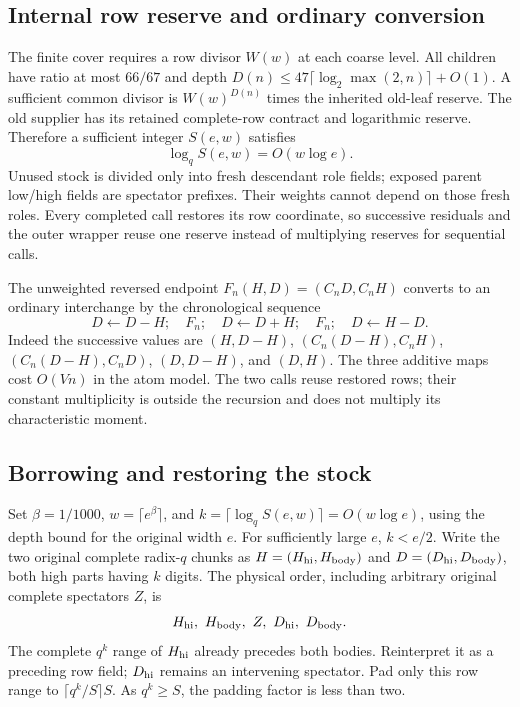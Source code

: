 \subsection{Internal row reserve and ordinary conversion}
The finite cover requires a row divisor $W(w)$ at each coarse level.
All children have ratio at most $66/67$ and depth
$D(n)\le47\lceil\log_2\max(2,n)\rceil+O(1)$.
A sufficient common divisor is $W(w)^{D(n)}$ times the inherited old-leaf
reserve. The old supplier has its retained complete-row contract and
logarithmic reserve. Therefore a sufficient integer $S(e,w)$ satisfies
\[
 \log_qS(e,w)=O(w\log e).
\]
Unused stock is divided only into fresh descendant role fields; exposed
parent low/high fields are spectator prefixes. Their weights cannot depend
on those fresh roles. Every completed call restores its row coordinate,
so successive residuals and the outer wrapper reuse one reserve instead
of multiplying reserves for sequential calls.

The unweighted reversed endpoint $F_n(H,D)=(C_nD,C_nH)$ converts to an
ordinary interchange by the chronological sequence
\[
 D\leftarrow D-H;\quad F_n;\quad D\leftarrow D+H;\quad
 F_n;\quad D\leftarrow H-D.
\]
Indeed the successive values are $(H,D-H)$, $(C_n(D-H),C_nH)$,
$(C_n(D-H),C_nD)$, $(D,D-H)$, and $(D,H)$.
The three additive maps cost $O(Vn)$ in the atom model. The two calls
reuse restored rows; their constant multiplicity is outside the recursion
and does not multiply its characteristic moment.

\subsection{Borrowing and restoring the stock}
Set $\beta=1/1000$, $w=\lceil e^\beta\rceil$, and
$k=\lceil\log_qS(e,w)\rceil=O(w\log e)$, using the depth bound for the
original width $e$. For sufficiently large $e$, $k<e/2$. Write the two
original complete radix-$q$ chunks as $H=(H_{\rm hi},H_{\rm body})$ and
$D=(D_{\rm hi},D_{\rm body})$, both high parts having $k$ digits. The
physical order, including arbitrary original complete spectators $Z$, is
\[
 H_{\rm hi},\ H_{\rm body},\ Z,\ D_{\rm hi},\ D_{\rm body}.
\]
The complete $q^k$ range of $H_{\rm hi}$ already precedes both bodies.
Reinterpret it as a preceding row field; $D_{\rm hi}$ remains an intervening
spectator. Pad only this row range to $\lceil q^k/S\rceil S$. As $q^k\ge S$,
the padding factor is less than two.

